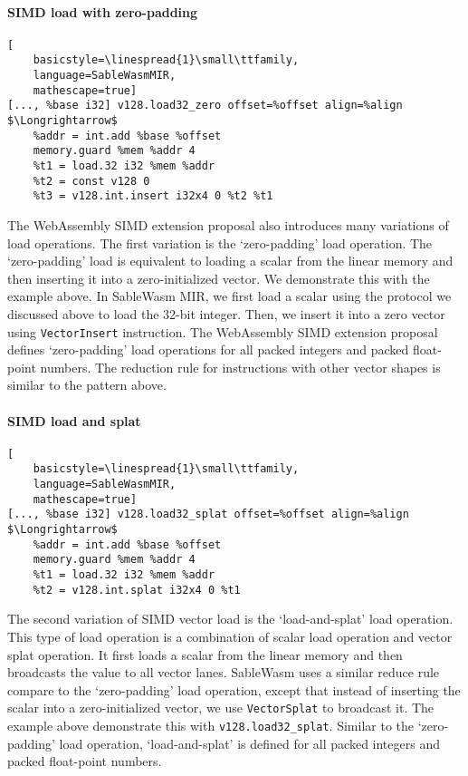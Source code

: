 \paragraph{SIMD load with zero-padding} \quad
\begin{lstlisting}[
    basicstyle=\linespread{1}\small\ttfamily, 
    language=SableWasmMIR, 
    mathescape=true]
[..., %base i32] v128.load32_zero offset=%offset align=%align $\Longrightarrow$
    %addr = int.add %base %offset
    memory.guard %mem %addr 4
    %t1 = load.32 i32 %mem %addr
    %t2 = const v128 0
    %t3 = v128.int.insert i32x4 0 %t2 %t1
\end{lstlisting}
The WebAssembly SIMD extension proposal also introduces many variations of load
operations. The first variation is the `zero-padding' load operation. The
`zero-padding' load is equivalent to loading a scalar from the linear memory and
then inserting it into a zero-initialized vector. We demonstrate this with the
example above. In SableWasm MIR, we first load a scalar using the protocol we
discussed above to load the 32-bit integer. Then, we insert it into a zero
vector using \texttt{VectorInsert} instruction. The WebAssembly SIMD extension
proposal defines `zero-padding' load operations for all packed integers and
packed float-point numbers. The reduction rule for instructions with other
vector shapes is similar to the pattern above.

\paragraph{SIMD load and splat} \quad
\begin{lstlisting}[
    basicstyle=\linespread{1}\small\ttfamily, 
    language=SableWasmMIR, 
    mathescape=true]
[..., %base i32] v128.load32_splat offset=%offset align=%align $\Longrightarrow$
    %addr = int.add %base %offset
    memory.guard %mem %addr 4
    %t1 = load.32 i32 %mem %addr
    %t2 = v128.int.splat i32x4 0 %t1
\end{lstlisting}
The second variation of SIMD vector load is the `load-and-splat' load operation.
This type of load operation is a combination of scalar load operation and vector
splat operation. It first loads a scalar from the linear memory and then
broadcasts the value to all vector lanes. SableWasm uses a similar reduce rule
compare to the `zero-padding' load operation, except that instead of inserting
the scalar into a zero-initialized vector, we use \texttt{VectorSplat} to
broadcast it. The example above demonstrate this with
\texttt{v128.load32\_splat}. Similar to the `zero-padding' load operation,
`load-and-splat' is defined for all packed integers and packed float-point
numbers.

